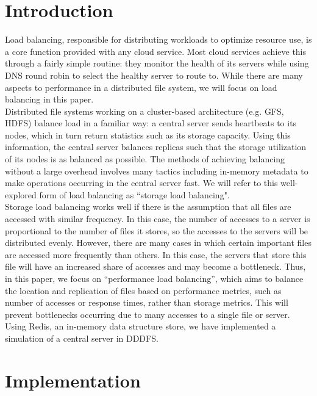 \documentclass[twoside]{article}
\begin{document}
\begin{multicols}{2} %

\section{Introduction}

  Load balancing, responsible for distributing workloads to optimize resource use, is a core function provided with any cloud service. Most cloud services achieve this through a fairly simple routine: they monitor the health of its servers while using DNS round robin to select the healthy server to route to. While there are many aspects to performance in a distributed file system, we will focus on load balancing in this paper.\\\indent
Distributed file systems working on a cluster-based architecture (e.g. GFS, HDFS) balance load in a familiar way: a central server sends heartbeats to its nodes, which in turn return statistics such as its storage capacity.  Using this information, the central server balances replicas such that the storage utilization of its nodes is as balanced as possible. The methods of achieving balancing without a large overhead involves many tactics including in-memory metadata to make operations occurring in the central server fast. We will refer to this well-explored form of load balancing as ``storage load balancing".\\\indent
  Storage load balancing works well if there is the assumption that all files are accessed with similar frequency. In this case, the number of accesses to a server is proportional to the number of files it stores, so the accesses to the servers will be distributed evenly. However, there are many cases in which certain important files are accessed more frequently than others. In this case, the servers that store this file will have an increased share of accesses and may become a bottleneck. Thus, in this paper, we focus on “performance load balancing”, which aims to balance the location and replication of files based on performance metrics, such as number of accesses or response times, rather than storage metrics. This will prevent bottlenecks occurring due to many accesses to a single file or server. Using Redis, an in-memory data structure store, we have implemented a simulation of a central server in DDDFS.


\section{Implementation}

\end{multicols}
\end{document}
